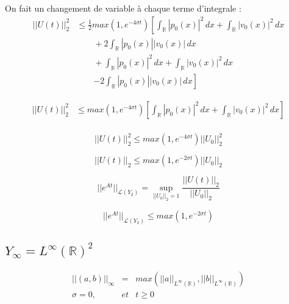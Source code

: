 \documentclass[a4paper,11pt]{article}
\begin{document}
On fait un changement de variable à chaque terme d'integrale :
\begin{equation*}
\begin{split}
    ||U(t)||^{2}_{2} & \le \frac{1}{2} max(1, e^{-4\sigma t}) \left[ \int_{\mathbb{R}}|p_0(x)|^{2} \,dx + \int_{\mathbb{R}} |v_0(x)|^{2} \,dx \right. \\
   & \left. \qquad  + 2 \int_{\mathbb{R}} |p_0(x)| |v_0(x)| \,dx \right. \\
   & \left. \qquad + \int_{\mathbb{R}}|p_0(x)|^{2} \,dx + \int_{\mathbb{R}} |v_0(x)|^{2} \,dx \right. \\
   & \qquad \left. - 2 \int_{\mathbb{R}} |p_0(x)| |v_0(x)| \,dx 
    \right]
\end{split}
\end{equation*}


\begin{equation*}
\begin{split}
    ||U(t)||^{2}_{2} & \le max(1, e^{-4\sigma t}) \left[ \int_{\mathbb{R}}|p_0(x)|^{2} \,dx + \int_{\mathbb{R}} |v_0(x)|^{2} \,dx \right] \\
\end{split}
\end{equation*}


\begin{equation*}
    ||U(t)||^{2}_{2} \le max(1, e^{-4\sigma t}) ||U_{0}||^{2}_{2}
\end{equation*}

\begin{equation*}
    ||U(t)||_{2} \le max(1, e^{-2\sigma t}) ||U_{0}||_{2}
\end{equation*}

\begin{equation*}
||e^{At}||_{\mathcal{L}(Y_{2})} = \sup_{||U_{0}||_{2} = 1}\frac{||U(t)||_{2}}{||U_{0}||_{2}}
\end{equation*}

\begin{equation*}
    ||e^{At}||_{\mathcal{L}(Y_{2})} \le max(1, e^{-2\sigma t})
\end{equation*}


\subsection{\( Y_{\infty} = L^{\infty}(\mathbb{R})^{2} \)}

\begin{equation*}
\begin{array}{rcl}
    ||(a,b)||_{\infty} &=& max(||a||_{L^{\infty}(\mathbb{R})}, ||b||_{L^{\infty}(\mathbb{R})}) \\
    \sigma = 0, & et & t\ge 0
\end{array}
\end{equation*}
\end{document}
